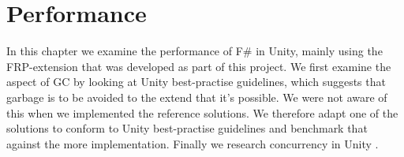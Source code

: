 \chapter{Performance}
In this chapter we examine the performance of F\# in Unity, mainly using the \gls{FRP}-extension that was developed as part of this project. We first examine the aspect of \gls{GC} by looking at Unity best-practise guidelines, which suggests that garbage is to be avoided to the extend that it's possible. We were not aware of this when we implemented the reference solutions. We therefore adapt one of the solutions to conform to Unity best-practise guidelines and benchmark that against the more  implementation. Finally we research concurrency in Unity .


